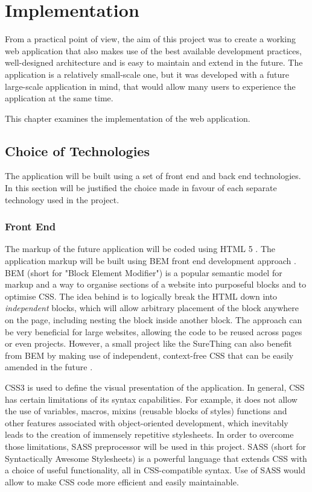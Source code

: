 \chapter{Implementation}
\label{ch:implementation}
From a practical point of view, the aim of this project was to create a working web application that also makes use of the best available development practices, well-designed architecture and is easy to maintain and extend in the future. The application is a relatively small-scale one, but it was developed with a future large-scale application in mind, that would allow many users to experience the application at the same time.

This chapter examines the implementation of the web application.

\section{Choice of Technologies}
\label{sec:choiceoftechnologies}
The application will be built using a set of front end and back end technologies. In this section will be justified the choice made in favour of each separate technology used in the project. 

\subsection{Front End}
The markup of the future application will be coded using HTML 5 \cite{documentation:HTML}. The application markup will be built using BEM front end development approach \cite{documentation:BEM}. BEM (short for "Block Element Modifier") is a popular semantic model for markup and a way to organise sections of a website into purposeful blocks and to optimise CSS. The idea behind is to logically break the HTML down into \emph{independent} blocks, which will allow arbitrary placement of the block anywhere on the page, including nesting the block inside another block. The approach can be  very beneficial for large websites, allowing the code to be reused across pages or even projects. However, a small project like the SureThing can also benefit from BEM by making use of independent, context-free CSS that can be easily amended in the future \cite{article:BEMForSmallProjects}.

CSS3 is used to define the visual presentation of the application. In general, CSS has certain limitations of its syntax capabilities. For example, it does not allow the use of variables, macros, mixins (reusable blocks of styles) functions and other features associated with object-oriented development, which inevitably leads to the creation of immensely repetitive stylesheets. In order to overcome those limitations, SASS preprocessor \cite{documentation:SASS} will be used in this project. SASS (short for Syntactically Awesome Stylesheets) is a powerful language that extends CSS with a choice of useful functionality, all in CSS-compatible syntax. Use of SASS would allow to make CSS code more efficient and easily maintainable. 

